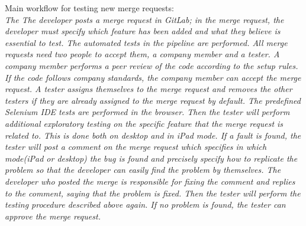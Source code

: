 \noindent Main workflow for testing new merge requests:\\
  \emph{The The developer posts a merge request in GitLab; in the merge request, the developer must specify which feature has been added and what they believe is essential to test. The automated tests in the pipeline are performed. All merge requests need two people to accept them, a company member and a tester. A company member performs a peer review of the code according to the setup rules. If the code follows company standards, the company member can accept the merge request. A tester assigns themselves to the merge request and removes the other testers if they are already assigned to the merge request by default. The predefined Selenium IDE tests are performed in the browser. Then the tester will perform additional exploratory testing on the specific feature that the merge request is related to. This is done both on desktop and in iPad mode. If a fault is found, the tester will post a comment on the merge request which specifies in which mode(iPad or desktop) the bug is found and precisely specify how to replicate the problem so that the developer can easily find the problem by themselves. The developer who posted the merge is responsible for fixing the comment and replies to the comment, saying that the problem is fixed. Then the tester will perform the testing procedure described above again. If no problem is found, the tester can approve the merge request.}\\  
  
